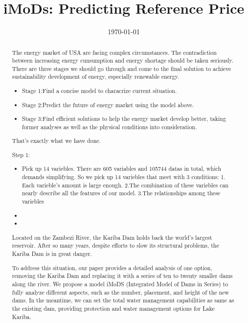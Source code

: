 \documentclass{mcmthesis}
\begin{document}
\linespread{0.6} %
\setlength{\parskip}{0.5\baselineskip} %
\title{iMoDs: Predicting Reference Price }

\date{\today}
	\begin{abstract}
	

	The energy market of USA are facing complex circumstances. The contradiction between increasing energy cunsumption and energy shortage should be taken seriously. There are three stages we should go through and come to the final solution to achieve sustainability development of energy, especially renewable energy.
	\begin{itemize}
		\item Stage 1:Find a concise model to characrize current situation.
		\item Stage 2:Predict the future of energy market using the model above.
		\item Stage 3:Find efficient solutions to help the energy market develop better, taking former analyses as well as the physical conditions into consideration.
	\end{itemize}

		That's exactly what we have done.

		Step 1:
		\begin{itemize}
			\item Pick up 14 variebles. There are 605 variables and 105744 datas in total, which demands simplifying. So we pick up 14 variebles that meet with 3 conditions: 1. Each varieble's amount is large enough. 2.The combination of these variebles can nearly describe all the features of our model. 3.The relationships among these variebles 
			\item
			\item
		\end{itemize}











		Located on the Zambezi River, the Kariba Dam holds back the world's largest reservoir. After so many years, despite efforts to slow its structural problems, the Kariba Dam is in great danger.

To address this situation, our paper provides a detailed analysis of one option, removing the Kariba Dam and replacing it with a series of ten to twenty smaller dams along the river. We propose a model iMoDS (Integrated Model of Dams in Series) to fully analyze different aspects, such as the number, placement, and height of the new dams. In the meantime, we can set the total water management capabilities as same as the existing dam, providing protection and water management options for Lake Kariba.


\end{abstract}
\end{document}
